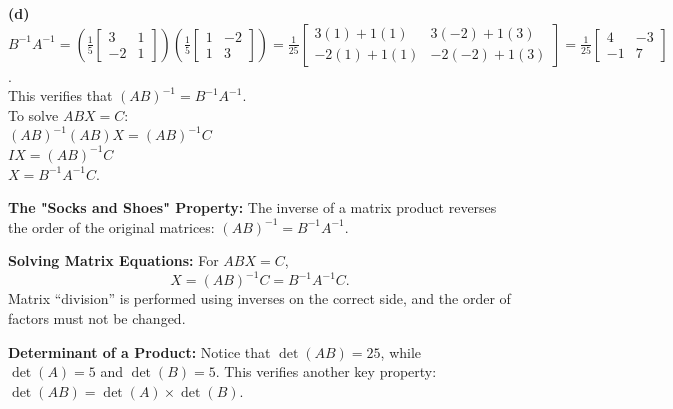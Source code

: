 \begin{solution}
\medskip
\textbf{(d)} \\
$B^{-1}A^{-1} = \left( \frac{1}{5}\begin{bmatrix} 3 & 1 \\ -2 & 1 \end{bmatrix} \right) \left( \frac{1}{5}\begin{bmatrix} 1 & -2 \\ 1 & 3 \end{bmatrix} \right) = \frac{1}{25} \begin{bmatrix} 3(1)+1(1) & 3(-2)+1(3) \\ -2(1)+1(1) & -2(-2)+1(3) \end{bmatrix} = \frac{1}{25}\begin{bmatrix} 4 & -3 \\ -1 & 7 \end{bmatrix}$. \\
This verifies that $(AB)^{-1} = B^{-1}A^{-1}$. \\
To solve $ABX = C$: \\
$(AB)^{-1}(AB)X = (AB)^{-1}C$ \\
$IX = (AB)^{-1}C$ \\
$X = B^{-1}A^{-1}C$.
\end{solution}

\begin{takeaways}
\item \textbf{The "Socks and Shoes" Property:} The inverse of a matrix product reverses the order of the original matrices: $(AB)^{-1} = B^{-1}A^{-1}$.
\item \textbf{Solving Matrix Equations:} For $ABX=C$,
\[
X=(AB)^{-1}C=B^{-1}A^{-1}C.
\]
Matrix ``division'' is performed using inverses on the correct side, and the order of factors must not be changed.
\item \textbf{Determinant of a Product:} Notice that $\det(AB) = 25$, while $\det(A) = 5$ and $\det(B) = 5$. This verifies another key property: $\det(AB) = \det(A) \times \det(B)$.
\end{takeaways}


